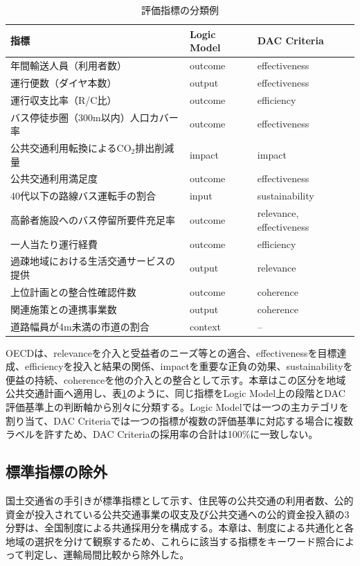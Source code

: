 \begin{table}[htbp]
\caption{評価指標の分類例}
\label{tab:classification_examples}
\centering
\small
\begin{tabularx}{\textwidth}{p{5.2cm}p{2.4cm}X}
\toprule
指標 & Logic Model & DAC Criteria \\
\midrule
年間輸送人員（利用者数） & outcome & effectiveness \\
運行便数（ダイヤ本数） & output & effectiveness \\
運行収支比率（R/C比） & outcome & efficiency \\
バス停徒歩圏（300m以内）人口カバー率 & outcome & effectiveness \\
公共交通利用転換によるCO$_2$排出削減量 & impact & impact \\
公共交通利用満足度 & outcome & effectiveness \\
40代以下の路線バス運転手の割合 & input & sustainability \\
高齢者施設へのバス停留所要件充足率 & outcome & relevance, effectiveness \\
一人当たり運行経費 & outcome & efficiency \\
過疎地域における生活交通サービスの提供 & output & relevance \\
上位計画との整合性確認件数 & outcome & coherence \\
関連施策との連携事業数 & output & coherence \\
道路幅員が4m未満の市道の割合 & context & -- \\
\bottomrule
\end{tabularx}
\end{table}

OECD\cite{oecd2021}は、relevanceを介入と受益者のニーズ等との適合、effectivenessを目標達成、efficiencyを投入と結果の関係、impactを重要な正負の効果、sustainabilityを便益の持続、coherenceを他の介入との整合として示す。本章はこの区分を地域公共交通計画へ適用し、表\ref{tab:classification_examples}のように、同じ指標をLogic Model上の段階とDAC評価基準上の判断軸から別々に分類する。Logic Modelでは一つの主カテゴリを割り当て、DAC Criteriaでは一つの指標が複数の評価基準に対応する場合に複数ラベルを許すため、DAC Criteriaの採用率の合計は100\%に一致しない。

\subsection{標準指標の除外}

国土交通省の手引きが標準指標として示す、住民等の公共交通の利用者数、公的資金が投入されている公共交通事業の収支及び公共交通への公的資金投入額の3分野は、全国制度による共通採用分を構成する\cite{mlit2023}。本章は、制度による共通化と各地域の選択を分けて観察するため、これらに該当する指標をキーワード照合によって判定し、運輸局間比較から除外した。

